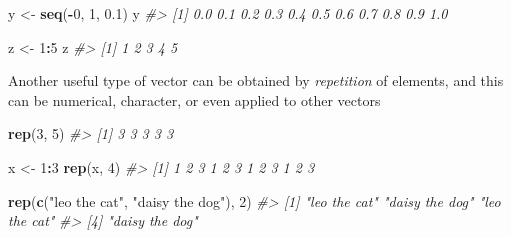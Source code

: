 \documentclass[
]{book}
\newenvironment{Shaded}{\begin{snugshade}}{\end{snugshade}}
\newcommand{\CommentTok}[1]{\textcolor[rgb]{0.56,0.35,0.01}{\textit{#1}}}
\newcommand{\DecValTok}[1]{\textcolor[rgb]{0.00,0.00,0.81}{#1}}
\newcommand{\FloatTok}[1]{\textcolor[rgb]{0.00,0.00,0.81}{#1}}
\newcommand{\FunctionTok}[1]{\textcolor[rgb]{0.13,0.29,0.53}{\textbf{#1}}}
\newcommand{\NormalTok}[1]{#1}
\newcommand{\OtherTok}[1]{\textcolor[rgb]{0.56,0.35,0.01}{#1}}
\newcommand{\SpecialCharTok}[1]{\textcolor[rgb]{0.81,0.36,0.00}{\textbf{#1}}}
\newcommand{\StringTok}[1]{\textcolor[rgb]{0.31,0.60,0.02}{#1}}
\begin{document}
\begin{Shaded}
\begin{Highlighting}[]

\NormalTok{y }\OtherTok{\textless{}{-}} \FunctionTok{seq}\NormalTok{(}\SpecialCharTok{{-}}\DecValTok{0}\NormalTok{, }\DecValTok{1}\NormalTok{, }\FloatTok{0.1}\NormalTok{)}
\NormalTok{y}
\CommentTok{\#\textgreater{}  [1] 0.0 0.1 0.2 0.3 0.4 0.5 0.6 0.7 0.8 0.9 1.0}
\end{Highlighting}
\end{Shaded}

\begin{Shaded}
\begin{Highlighting}[]

\NormalTok{z }\OtherTok{\textless{}{-}} \DecValTok{1}\SpecialCharTok{:}\DecValTok{5}
\NormalTok{z}
\CommentTok{\#\textgreater{} [1] 1 2 3 4 5}
\end{Highlighting}
\end{Shaded}

Another useful type of vector can be obtained by \emph{repetition} of elements, and this can be numerical, character, or even applied to other vectors

\begin{Shaded}
\begin{Highlighting}[]
\FunctionTok{rep}\NormalTok{(}\DecValTok{3}\NormalTok{, }\DecValTok{5}\NormalTok{)}
\CommentTok{\#\textgreater{} [1] 3 3 3 3 3}
\end{Highlighting}
\end{Shaded}

\begin{Shaded}
\begin{Highlighting}[]

\NormalTok{x }\OtherTok{\textless{}{-}} \DecValTok{1}\SpecialCharTok{:}\DecValTok{3}
\FunctionTok{rep}\NormalTok{(x, }\DecValTok{4}\NormalTok{)}
\CommentTok{\#\textgreater{}  [1] 1 2 3 1 2 3 1 2 3 1 2 3}
\end{Highlighting}
\end{Shaded}

\begin{Shaded}
\begin{Highlighting}[]

\FunctionTok{rep}\NormalTok{(}\FunctionTok{c}\NormalTok{(}\StringTok{"leo the cat"}\NormalTok{, }\StringTok{"daisy the dog"}\NormalTok{), }\DecValTok{2}\NormalTok{)}
\CommentTok{\#\textgreater{} [1] "leo the cat"   "daisy the dog" "leo the cat"  }
\CommentTok{\#\textgreater{} [4] "daisy the dog"}
\end{Highlighting}
\end{Shaded}
\end{document}
